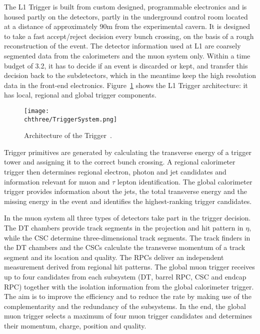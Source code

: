 The L1 Trigger is built from custom designed, programmable electronics and is housed partly on the detectors, partly in the underground control room located at a distance of approximately 90\unit{m} from the experimental cavern. It is designed to take a fast accept/reject decision every bunch crossing, on the basis of a rough reconstruction of the event. 
The detector information used at L1 are coarsely segmented data from the calorimeters and the muon system only. Within a time budget of 3.2\mus, it has to decide if an event is discarded or kept, and transfer this decision back to the subdetectors, which in the meantime keep the high resolution data in the front-end electronics. Figure~\ref{fig:TriggerSystem} shows the L1 Trigger architecture: it has local, regional and global trigger components. 

\begin{figure}[!htb]
 \begin{center}
  \texttt{[image: \\chthree/TriggerSystem.png]}
 \end{center}
 \caption{Architecture of the \Lone Trigger~\cite{Chatrchyan:2008zzk}.}
 \label{fig:TriggerSystem}
\end{figure}

Trigger primitives are generated by calculating the transverse energy of a trigger tower and assigning it to the correct bunch crossing. A regional calorimeter trigger then determines regional electron, photon and jet candidates and information relevant for muon and $\tau$ lepton identification. The global calorimeter trigger provides information about the jets, the total transverse energy and the missing energy in the event and identifies the highest-ranking trigger candidates. 

In the muon system all three types of detectors take part in the trigger decision. The DT chambers provide track segments in the projection and hit pattern in $\eta$, while the CSC determine three-dimensional track segments. The track finders in the DT chambers and the CSCs calculate the transverse momentum of a track segment and its location and quality. The RPCs deliver an independent measurement derived from regional hit patterns. The global muon trigger receives up to four candidates from each subsystem (DT, barrel RPC, CSC and endcap RPC) together with the isolation information from the global calorimeter trigger. The aim is to improve the efficiency and to reduce the rate by making use of the complementarity and the redundancy of the subsystems. In the end, the global muon trigger selects a maximum of four muon trigger candidates and determines their momentum, charge, position and quality.

